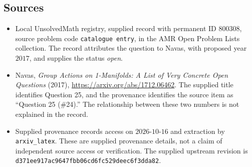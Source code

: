 \documentclass[11pt]{article}
\begin{document}
\subsection{Sources}
\begin{itemize}
\item Local UnsolvedMath registry, supplied record with permanent ID \(800308\), source problem code \texttt{catalogue entry}, in the AMR Open Problem Lists collection. The record attributes the question to Navas, with proposed year \(2017\), and supplies the status \emph{open}.
\item Navas, \emph{Group Actions on 1-Manifolds: A List of Very Concrete Open Questions} (2017), \url{https://arxiv.org/abs/1712.06462}. The supplied title identifies Question 25, and the provenance identifies the source item as ``Question 25 (\#24).'' The relationship between these two numbers is not explained in the record.
\item Supplied provenance records access on \(2026\text{-}10\text{-}16\) and extraction by \texttt{arxiv\_latex}. These are supplied provenance details, not a claim of independent source access or verification. The supplied upstream revision is \texttt{d371ee917ac9647fbb06cd6fc529deec6f3dda82}.
\end{itemize}
\end{document}

